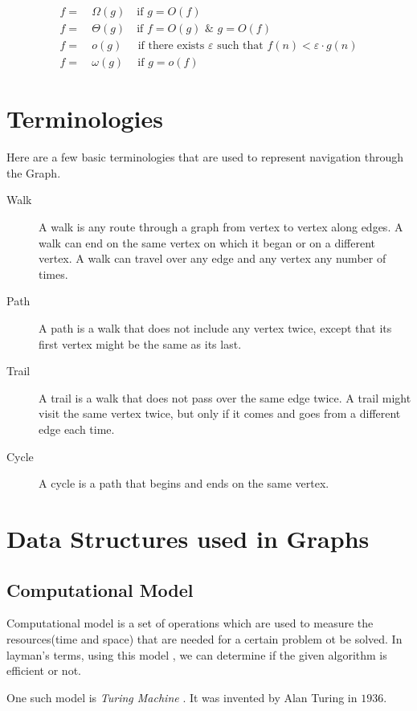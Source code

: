 \documentclass[12pt,a4paper]{extarticle}
\begin{document}
\begin{align}
f =&\:\Omega(g)\quad  \textrm{if} \,\,  g=O(f)\\
f =&\:\Theta(g)\quad \textrm{if} \,\,  f=O(g) \,\, \& \,\, g=O(f)\\
f =&\:o(g)\:\,\quad \textrm{if there exists }\varepsilon \textrm{ such that} \,\, f(n)<\varepsilon\cdot g(n) \\
f =&\:\omega(g)\quad \:\textrm{if} \,\,  g=o(f)
\end{align}
\newpage
\section{Terminologies}
Here are a few basic terminologies that are used to represent navigation through the Graph. \\
\begin{adjustwidth}{1.5em}{0pt}
\begin{description}
\item [Walk] A walk is any route through a graph from vertex to vertex along edges. A walk can end on the same vertex on which it began or on a different vertex. A walk can travel over any edge and any vertex any number of times.
\item [Path] A path is a walk that does not include any vertex twice, except that its first vertex might be the same as its last.
\item [Trail] A trail is a walk that does not pass over the same edge twice. A trail might visit the same vertex twice, but only if it comes and goes from a different edge each time.
\item [Cycle] A cycle is a path that begins and ends on the same vertex.	
\end{description}
\end{adjustwidth}

\section{Data Structures used in Graphs}
\subsection{Computational Model}
Computational model is a set of operations which are used to measure the resources(time and space) that are needed for a certain problem ot be solved. In layman's terms, using this model , we can determine if the given algorithm is efficient or not. \par
One such model is \textit{Turing Machine} . It was invented by Alan Turing in $1936$. 
\end{document}
